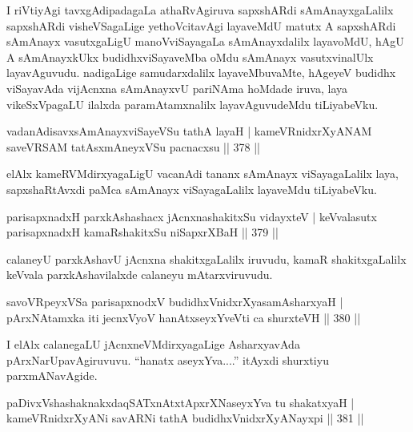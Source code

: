 \begin{artha}
I riVtiyAgi tavxgAdipadagaLa athaRvAgiruva sapxshARdi sAmAnayx\-gaLalilx sapxshARdi visheVSagaLige yethoVcitavAgi layaveMdU matutx A sapxshARdi sAmAnayx vasutx\-gaLigU manoVviSayagaLa sAmAnayxdalilx layavoMdU, hAgU A sAmAnayxkUkx budidhxviSayaveMba oMdu sAmAnayx vasutxvinalUlx layavAguvudu. nadigaLige samudarxdalilx layaveMbuvaMte, hAgeyeV budidhx viSayavAda vijAcnxna sAmAnayxvU pariNAma hoMdade iruva, laya vikeSxVpagaLU ilalxda paramAtamxnalilx layavAgu\-vudeMdu tiLiyabeVku.
\end{artha}

\begin{shl}
vadanAdisavxsAmAnayxviSayeVSu tathA layaH |
kameVRnidxrXyANAM saveVRSAM tatAsxmAneyxVSu pacnacxsu \hfill || 378 ||
\end{shl}

\begin{artha}
elAlx kameRVMdirxyagaLigU vacanAdi tananx sAmAnayx viSayagaLalilx laya, sapxshaRtAvxdi paMca sAmAnayx viSayagaLalilx layaveMdu tiLiyabeVku.
\end{artha}


\begin{shl}
parisapxnadxH parxkAshashacx jAcnxnashakitxSu vidayxteV |
keVvalasutx parisapxnadxH kamaRshakitxSu niSapxrXBaH \hfill || 379 ||
\end{shl}

\begin{artha}
calaneyU parxkAshavU jAcnxna shakitxgaLalilx iruvudu, kamaR shakitxgaLalilx keVvala parxkAshavilalxde calaneyu mAtarxviruvudu.
\end{artha}

\begin{shl}
savoVR\s peyxVSa parisapxnodxV budidhxVnidxrXyasamAsharxyaH |
pArxNAtamxka iti jecnxVyoV hanAtxseyxYveVti ca shurxteVH \hfill || 380 ||
\end{shl}


\begin{artha}
I elAlx calanegaLU jAcnxneVMdirxyagaLige AsharxyavAda pArxNarUpa\-vAgiruvuvu. ``hanatx aseyxYva....'' itAyxdi shurxtiyu parxmANavAgide.
\end{artha}

\begin{shl}
paDivxVshashaknakxdaqSATxnAtxtApxrXNaseyxYva tu shakatxyaH |
kameVRnidxrXyANi savARNi tathA budidhxVnidxrXyANayxpi \hfill || 381 ||
\end{shl}

